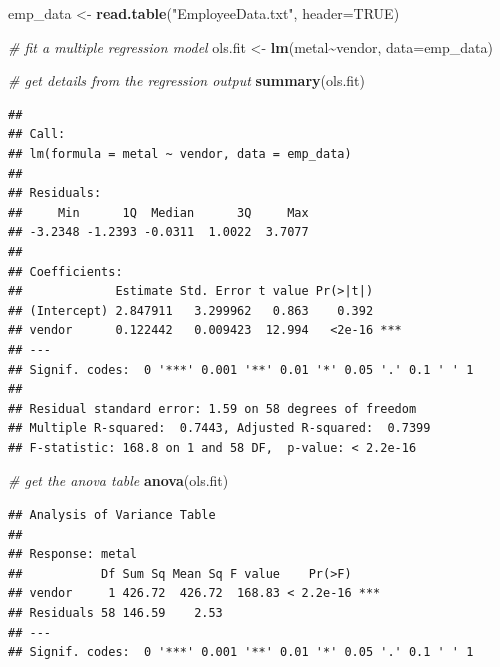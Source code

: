 \documentclass[
]{article}
\newenvironment{Shaded}{\begin{snugshade}}{\end{snugshade}}
\newcommand{\AttributeTok}[1]{\textcolor[rgb]{0.13,0.29,0.53}{#1}}
\newcommand{\CommentTok}[1]{\textcolor[rgb]{0.56,0.35,0.01}{\textit{#1}}}
\newcommand{\ConstantTok}[1]{\textcolor[rgb]{0.56,0.35,0.01}{#1}}
\newcommand{\FunctionTok}[1]{\textcolor[rgb]{0.13,0.29,0.53}{\textbf{#1}}}
\newcommand{\NormalTok}[1]{#1}
\newcommand{\OtherTok}[1]{\textcolor[rgb]{0.56,0.35,0.01}{#1}}
\newcommand{\SpecialCharTok}[1]{\textcolor[rgb]{0.81,0.36,0.00}{\textbf{#1}}}
\newcommand{\StringTok}[1]{\textcolor[rgb]{0.31,0.60,0.02}{#1}}
\begin{document}

\begin{Shaded}
\begin{Highlighting}[]
\NormalTok{emp\_data }\OtherTok{\textless{}{-}} \FunctionTok{read.table}\NormalTok{(}\StringTok{"EmployeeData.txt"}\NormalTok{, }\AttributeTok{header=}\ConstantTok{TRUE}\NormalTok{)}

\CommentTok{\# fit a multiple regression model}
\NormalTok{ols.fit }\OtherTok{\textless{}{-}} \FunctionTok{lm}\NormalTok{(metal}\SpecialCharTok{\textasciitilde{}}\NormalTok{vendor, }\AttributeTok{data=}\NormalTok{emp\_data)}

\CommentTok{\# get details from the regression output}
\FunctionTok{summary}\NormalTok{(ols.fit)}
\end{Highlighting}
\end{Shaded}

\begin{verbatim}
## 
## Call:
## lm(formula = metal ~ vendor, data = emp_data)
## 
## Residuals:
##     Min      1Q  Median      3Q     Max 
## -3.2348 -1.2393 -0.0311  1.0022  3.7077 
## 
## Coefficients:
##             Estimate Std. Error t value Pr(>|t|)    
## (Intercept) 2.847911   3.299962   0.863    0.392    
## vendor      0.122442   0.009423  12.994   <2e-16 ***
## ---
## Signif. codes:  0 '***' 0.001 '**' 0.01 '*' 0.05 '.' 0.1 ' ' 1
## 
## Residual standard error: 1.59 on 58 degrees of freedom
## Multiple R-squared:  0.7443, Adjusted R-squared:  0.7399 
## F-statistic: 168.8 on 1 and 58 DF,  p-value: < 2.2e-16
\end{verbatim}

\begin{Shaded}
\begin{Highlighting}[]
\CommentTok{\# get the anova table}
\FunctionTok{anova}\NormalTok{(ols.fit)}
\end{Highlighting}
\end{Shaded}

\begin{verbatim}
## Analysis of Variance Table
## 
## Response: metal
##           Df Sum Sq Mean Sq F value    Pr(>F)    
## vendor     1 426.72  426.72  168.83 < 2.2e-16 ***
## Residuals 58 146.59    2.53                      
## ---
## Signif. codes:  0 '***' 0.001 '**' 0.01 '*' 0.05 '.' 0.1 ' ' 1
\end{verbatim}
\end{document}
